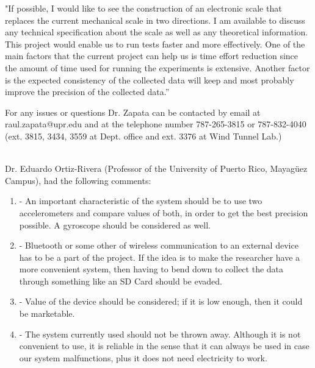	"If possible, I would like to see the construction of an electronic scale that replaces the current mechanical scale in two directions. I am available to discuss any technical specification about the scale as well as any theoretical information. This project would enable us to run tests faster and more effectively. One of the main factors that the current project can help us is time effort reduction since the amount of time used for running the experiments is extensive. Another factor is the expected consistency of the collected data will keep and most probably improve the precision of the collected data.”
 
 	For any issues or questions Dr. Zapata can be contacted by email at raul.zapata@upr.edu and at the telephone number 787-265-3815 or 787-832-4040 (ext. 3815, 3434, 3559 at Dept. office and ext. 3376 at Wind Tunnel Lab.)

	 \\
	
	Dr. Eduardo Ortiz-Rivera (Professor of  the University of Puerto Rico, Mayagüez Campus), had the following comments:
	
	\begin{enumerate}
		\item -	An important characteristic of the system should be to use two accelerometers and compare values of both, in order to get the best precision possible. A gyroscope should be considered as well.
		\item - Bluetooth or some other of wireless communication to an external device has to be a part of the project. If the idea is to make the researcher have a more convenient system, then having to bend down to collect the data through something like an SD Card should be evaded.
		\item -	Value of the device should be considered; if it is low enough, then it could be marketable.
		\item - The system currently used should not be thrown away. Although it is not convenient to use, it is reliable in the sense that it can always be used in case our system malfunctions, plus it does not need electricity to work. 
	\end{enumerate}
	

